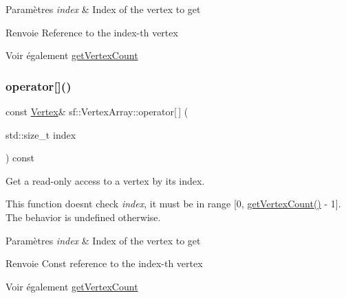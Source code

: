 \begin{DoxyParams}{Paramètres}
{\em index} & Index of the vertex to get\\
\hline
\end{DoxyParams}
\begin{DoxyReturn}{Renvoie}
Reference to the index-\/th vertex
\end{DoxyReturn}
\begin{DoxySeeAlso}{Voir également}
\hyperlink{classsf_1_1VertexArray_abda90e8d841a273d93164f0c0032bd8d}{get\+Vertex\+Count} 
\end{DoxySeeAlso}
\mbox{\label{classsf_1_1VertexArray_a6bfcf91c01c754e86ee8b44b6c79441b}} 
\subsubsection{\texorpdfstring{operator[]()}{operator[]()}\hspace{0.1cm}{\footnotesize\ttfamily [2/2]}}
{\footnotesize\ttfamily const \hyperlink{classsf_1_1Vertex}{Vertex}\& sf\+::\+Vertex\+Array\+::operator\mbox{[}$\,$\mbox{]} (\begin{DoxyParamCaption}\item[{std\+::size\+\_\+t}]{index }\end{DoxyParamCaption}) const}



Get a read-\/only access to a vertex by its index. 

This function doesn\textquotesingle{}t check {\itshape index}, it must be in range \mbox{[}0, \hyperlink{classsf_1_1VertexArray_abda90e8d841a273d93164f0c0032bd8d}{get\+Vertex\+Count()} -\/ 1\mbox{]}. The behavior is undefined otherwise.


\begin{DoxyParams}{Paramètres}
{\em index} & Index of the vertex to get\\
\hline
\end{DoxyParams}
\begin{DoxyReturn}{Renvoie}
Const reference to the index-\/th vertex
\end{DoxyReturn}
\begin{DoxySeeAlso}{Voir également}
\hyperlink{classsf_1_1VertexArray_abda90e8d841a273d93164f0c0032bd8d}{get\+Vertex\+Count} 
\end{DoxySeeAlso}
\mbox{\label{classsf_1_1VertexArray_a0c0fe239e8f9a54e64d3bbc96bf548c0}} 
